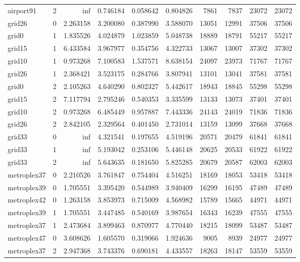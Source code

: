 \begin{longtable}{|l|r|r|r|r|r|r|r|r|r|}
airport91 & 2 & inf & 0.746184 & 0.058642 & 0.804826 & 7861 & 7837 & 23072 & 23072 \\
grid26 & 0 & 2.263158 & 3.200080 & 0.387990 & 3.588070 & 13051 & 12991 & 37506 & 37506 \\
grid0 & 1 & 1.835526 & 4.024879 & 1.023859 & 5.048738 & 18889 & 18791 & 55217 & 55217 \\
grid15 & 1 & 6.433584 & 3.967977 & 0.354756 & 4.322733 & 13067 & 13007 & 37302 & 37302 \\
grid10 & 1 & 0.973268 & 7.100583 & 1.537571 & 8.638154 & 24097 & 23973 & 71767 & 71767 \\
grid26 & 1 & 2.368421 & 3.523175 & 0.284766 & 3.807941 & 13101 & 13041 & 37581 & 37581 \\
grid0 & 2 & 2.105263 & 4.640290 & 0.802327 & 5.442617 & 18943 & 18845 & 55298 & 55298 \\
grid15 & 2 & 7.117794 & 2.795246 & 0.540353 & 3.335599 & 13133 & 13073 & 37401 & 37401 \\
grid10 & 2 & 0.973268 & 6.485449 & 0.957887 & 7.443336 & 24143 & 24019 & 71836 & 71836 \\
grid26 & 2 & 2.842105 & 2.329564 & 0.401450 & 2.731014 & 13159 & 13099 & 37668 & 37668 \\
grid33 & 0 & inf & 4.321541 & 0.197655 & 4.519196 & 20571 & 20479 & 61841 & 61841 \\
grid33 & 1 & inf & 5.193042 & 0.253106 & 5.446148 & 20625 & 20533 & 61922 & 61922 \\
grid33 & 2 & inf & 5.643635 & 0.181650 & 5.825285 & 20679 & 20587 & 62003 & 62003 \\
metroplex37 & 0 & 2.210526 & 3.761847 & 0.754404 & 4.516251 & 18169 & 18053 & 53418 & 53418 \\
metroplex39 & 0 & 1.705551 & 3.395420 & 0.544989 & 3.940409 & 16299 & 16195 & 47489 & 47489 \\
metroplex42 & 0 & 1.263158 & 3.853973 & 0.715009 & 4.568982 & 15789 & 15665 & 44971 & 44971 \\
metroplex39 & 1 & 1.705551 & 3.447485 & 0.540169 & 3.987654 & 16343 & 16239 & 47555 & 47555 \\
metroplex37 & 1 & 2.473684 & 3.899463 & 0.870977 & 4.770440 & 18215 & 18099 & 53487 & 53487 \\
metroplex47 & 0 & 3.608626 & 1.605570 & 0.319066 & 1.924636 & 9005 & 8939 & 24977 & 24977 \\
metroplex37 & 2 & 2.947368 & 3.743376 & 0.690181 & 4.433557 & 18263 & 18147 & 53559 & 53559 \\

\end{longtable}
